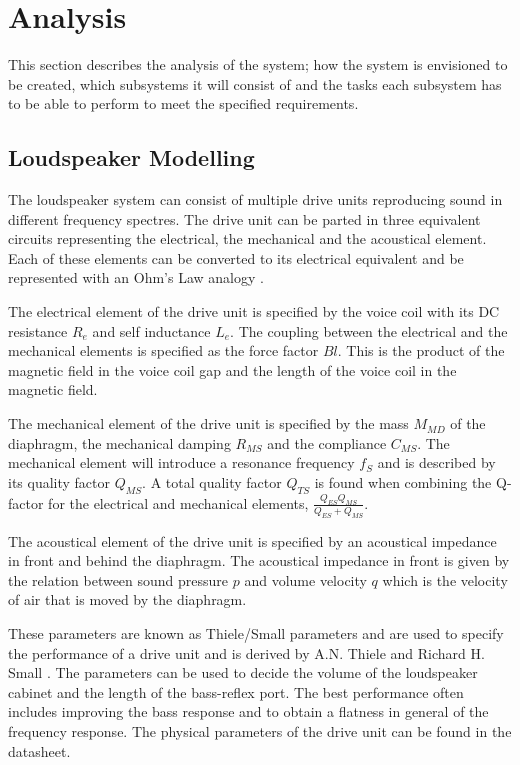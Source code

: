 
\chapter{Analysis}
This section describes the analysis of the system; how the system is envisioned to be created, which subsystems it will consist of and the tasks each subsystem has to be able to perform to meet the specified requirements.

\section{Loudspeaker Modelling}
The loudspeaker system can consist of multiple drive units reproducing sound in different frequency spectres.
The drive unit can be parted in three equivalent circuits representing the electrical, the mechanical and the acoustical element. 
Each of these elements can be converted to its electrical equivalent and be represented with an Ohm's Law analogy \cite[p.~115]{Elektroakustik}.

The electrical element of the drive unit is specified by the voice coil with its DC resistance $R_e$ and self inductance $L_e$. 
The coupling between the electrical and the mechanical elements is specified as the force factor $Bl$. 
This is the product of the magnetic field in the voice coil gap and the length of the voice coil in the magnetic field. \cite[p.~34]{Elektroakustik}

The mechanical element of the drive unit is specified by the mass $M_{MD}$ of the diaphragm, the mechanical damping $R_{MS}$ and the compliance $C_{MS}$. 
The mechanical element will introduce a resonance frequency $f_S$ and is described by its quality factor $Q_{MS}$. 
A total quality factor $Q_{TS}$ is found when combining the Q-factor for the electrical and mechanical elements, $\frac{Q_{ES}Q_{MS}}{Q_{ES}+Q_{MS}}$.

The acoustical element of the drive unit is specified by an acoustical impedance in front and behind the diaphragm. 
The acoustical impedance in front is given by the relation between sound pressure $p$ and volume velocity $q$ which is the velocity of air that is moved by the diaphragm. 

These parameters are known as Thiele/Small parameters and are used to specify the performance of a drive unit and is derived by A.N. Thiele \cite{thiele1971loudspeakers} and Richard H. Small \cite{small1972closed}.
The parameters can be used to decide the volume of the loudspeaker cabinet and the length of the bass-reflex port. 
The best performance often includes improving the bass response and to obtain a flatness in general of the frequency response. 
The physical parameters of the drive unit can be found in the datasheet.

